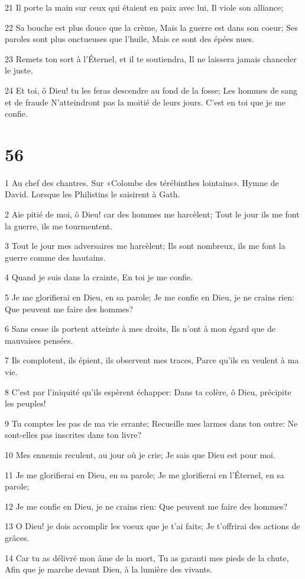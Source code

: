 \par 21 Il porte la main sur ceux qui étaient en paix avec lui, Il viole son alliance;
\par 22 Sa bouche est plus douce que la crème, Mais la guerre est dans son coeur; Ses paroles sont plus onctueuses que l'huile, Mais ce sont des épées nues.
\par 23 Remets ton sort à l'Éternel, et il te soutiendra, Il ne laissera jamais chanceler le juste.
\par 24 Et toi, ô Dieu! tu les feras descendre au fond de la fosse; Les hommes de sang et de fraude N'atteindront pas la moitié de leurs jours. C'est en toi que je me confie.

\chapter{56}

\par 1 Au chef des chantres. Sur «Colombe des térébinthes lointains». Hymne de David. Lorsque les Philistins le saisirent à Gath.
\par 2 Aie pitié de moi, ô Dieu! car des hommes me harcèlent; Tout le jour ils me font la guerre, ils me tourmentent.
\par 3 Tout le jour mes adversaires me harcèlent; Ils sont nombreux, ils me font la guerre comme des hautains.
\par 4 Quand je suis dans la crainte, En toi je me confie.
\par 5 Je me glorifierai en Dieu, en sa parole; Je me confie en Dieu, je ne crains rien: Que peuvent me faire des hommes?
\par 6 Sans cesse ils portent atteinte à mes droits, Ils n'ont à mon égard que de mauvaises pensées.
\par 7 Ils complotent, ils épient, ils observent mes traces, Parce qu'ils en veulent à ma vie.
\par 8 C'est par l'iniquité qu'ils espèrent échapper: Dans ta colère, ô Dieu, précipite les peuples!
\par 9 Tu comptes les pas de ma vie errante; Recueille mes larmes dans ton outre: Ne sont-elles pas inscrites dans ton livre?
\par 10 Mes ennemis reculent, au jour où je crie; Je sais que Dieu est pour moi.
\par 11 Je me glorifierai en Dieu, en sa parole; Je me glorifierai en l'Éternel, en sa parole;
\par 12 Je me confie en Dieu, je ne crains rien: Que peuvent me faire des hommes?
\par 13 O Dieu! je dois accomplir les voeux que je t'ai faits; Je t'offrirai des actions de grâces.
\par 14 Car tu as délivré mon âme de la mort, Tu as garanti mes pieds de la chute, Afin que je marche devant Dieu, à la lumière des vivants.

